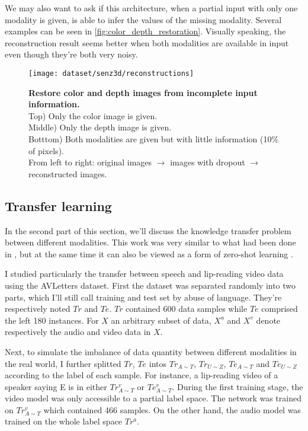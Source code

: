We may also want to ask if this architecture, when a partial input with
only one modality is given, is able to infer the values of the missing
modality.
Several examples can be seen in \autoref{fig:color_depth_restoration}.
Visually speaking, the reconstruction result seems better when
both modalities are available in input even though they're both very noisy.

\begin{figure}[H]
  \centering
  \texttt{[image: dataset/senz3d/reconstructions]}
  \caption{%
    \textbf{Restore color and depth images from incomplete input
      information.}\\[0.1em]
    Top) Only the color image is given.\\[0.1em]
    Middle) Only the depth image is given.\\[0.1em]
    Botttom) Both modalities are given but with little information
      (10\% of pixels).\\[0.1em]
    From left to right: original images $\rightarrow$ images with
      dropout $\rightarrow$ reconstructed images.
    }
  \label{fig:color_depth_restoration}
\end{figure}

\subsection{Transfer learning} \label{subsection:AVSR_transfer}

In the second part of this section, we'll discuss the knowledge transfer
problem between different modalities. This work was very similar to what
had been done in \cite{S. Moon 2015}, but at the same time it can also be
viewed as a form of zero-shot learning \cite{A. Frome 2013, R. Socher 2013}.

I studied particularly the transfer between speech and lip-reading
video data using the AVLetters dataset. First the dataset was separated
randomly into two parts, which I'll still call training and test set
by abuse of language. They're respectively noted $Tr$ and $Te$.
$Tr$ contained 600 data samples while $Te$ comprised the left 180 instances.
For $X$ an arbitrary subset of data, $X^a$ and $X^v$ denote respectively
the audio and video data in $X$.

Next, to simulate the imbalance of data quantity between different
modalities in the real world, I further splitted $Tr$, $Te$ intos
$Tr_{A\sim T}$, $Tr_{U\sim Z}$, $Te_{A\sim T}$ and $Te_{U\sim Z}$
according to the label of each sample.
For instance, a lip-reading video of a speaker saying E is in either
$Tr_{A\sim T}^v$ or $Te_{A\sim T}^v$.
During the first training stage, the video model was only accessible
to a partial label space. The network was trained on $Tr_{A\sim T}^v$
which contained 466 samples. On the other hand, the audio model was trained
on the whole label space $Tr^a$.

